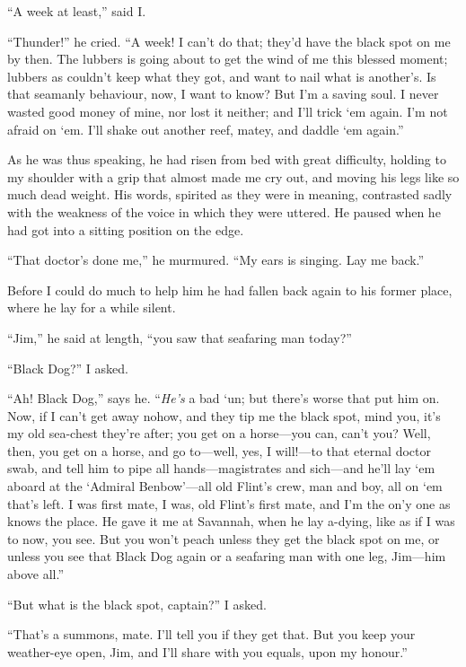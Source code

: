 \enquote{A week at least,} said I.

\enquote{Thunder!} he cried. \enquote{A week! I can’t do that; they’d have the black spot on me by then. The lubbers is going about to get the wind of me this blessed moment; lubbers as couldn’t keep what they got, and want to nail what is another’s. Is that seamanly behaviour, now, I want to know? But I’m a saving soul. I never wasted good money of mine, nor lost it neither; and I’ll trick `em again. I’m not afraid on `em. I’ll shake out another reef, matey, and daddle `em again.}

As he was thus speaking, he had risen from bed with great difficulty, holding to my shoulder with a grip that almost made me cry out, and moving his legs like so much dead weight. His words, spirited as they were in meaning, contrasted sadly with the weakness of the voice in which they were uttered. He paused when he had got into a sitting position on the edge.

\enquote{That doctor’s done me,} he murmured. \enquote{My ears is singing. Lay me back.}

Before I could do much to help him he had fallen back again to his former place, where he lay for a while silent.

\enquote{Jim,} he said at length, \enquote{you saw that seafaring man today?}

\enquote{Black Dog?} I asked.

\enquote{Ah! Black Dog,} says he. \enquote{\textit{He’s} a bad `un; but there’s worse that put him on. Now, if I can’t get away nohow, and they tip me the black spot, mind you, it’s my old sea-chest they’re after; you get on a horse---you can, can’t you? Well, then, you get on a horse, and go to---well, yes, I will!---to that eternal doctor swab, and tell him to pipe all hands---magistrates and sich---and he’ll lay `em aboard at the \enquote{Admiral Benbow}---all old Flint’s crew, man and boy, all on `em that’s left. I was first mate, I was, old Flint’s first mate, and I’m the on’y one as knows the place. He gave it me at Savannah, when he lay a-dying, like as if I was to now, you see. But you won’t peach unless they get the black spot on me, or unless you see that Black Dog again or a seafaring man with one leg, Jim---him above all.}

\enquote{But what is the black spot, captain?} I asked.

\enquote{That’s a summons, mate. I’ll tell you if they get that. But you keep your weather-eye open, Jim, and I’ll share with you equals, upon my honour.}

